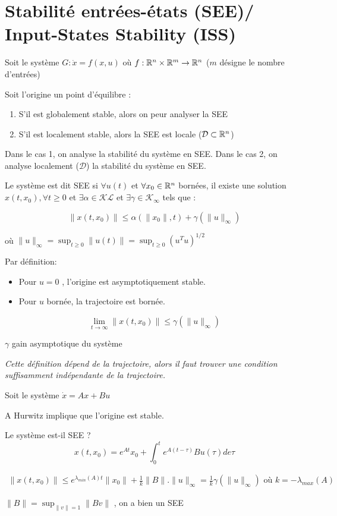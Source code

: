 \documentclass[main.tex]{subfiles} \newcommand{\D}{\mathcal{D}}
\newcommand{\Kc}{\mathcal{K}} \newcommand{\Lc}{\mathcal{L}}
\begin{document}
\section{Stabilité entrées-états (SEE)/ Input-States Stability (ISS)}

Soit le système $ G: \dot{x}=f(x,u)$ où $f:\mathbb{R}^n \times \mathbb{R}^m \rightarrow \mathbb{R}^n$
($m$ désigne le nombre d'entrées)

Soit l'origine un point d'équilibre :

\begin{enumerate} \item S'il est globalement stable, alors on peur analyser la
SEE \item S'il est localement stable, alors la SEE est locale ($\D \subset
\R^n$) \end{enumerate}

Dans le cas 1, on analyse la stabilité du système en SEE. Dans le cas 2, on
analyse localement ($\D$) la stabilité du système en SEE.

\begin{defin} Le système est dit SEE si $\forall u(t)$ et $\forall x_0 \in
	\mathbb{R}^n$ bornées, il existe une solution $x(t,x_0), \forall t \geq 0$ et
	$\exists \alpha \in \Kc\Lc$ et $\exists\gamma \in \Kc_{\infty}$ tels que :

  \[ \|x(t,x_0)\| \leq \alpha(\|x_0\|,t) + \gamma(\|u\|_{\infty})\]

  où $\|u\|_{\infty} = \sup_{t\geq0}\|u(t)\| = \sup_{t\geq0} (u^Tu)^{1/2}$

\end{defin} \begin{prop} Par définition: \begin{itemize} \item Pour $u=0$ ,
l'origine est asymptotiquement stable.  \item Pour $u$ bornée, la trajectoire
est bornée.  \end{itemize} \end{prop} \begin{rem} \[ \lim_{t \to \infty}
		\|x(t,x_0)\| \leq \gamma (\|u\|_{\infty}) \]

  $\gamma$ gain asymptotique du système \end{rem}


\emph{Cette définition dépend de la trajectoire, alors il faut trouver une
condition suffisamment indépendante de la trajectoire.}


\begin{exemple} Soit le système $\dot{x}= Ax + Bu$

  A Hurwitz implique que l'origine est stable.

  Le système est-il SEE ?  \[ x(t,x_0) = e^{At}x_0 + \int_0^t e^{A(t-\tau)}
	Bu(\tau) de \tau \]

  \begin{align*} \|x(t,x_0)\| \leq e^{\lambda_{min}(A)t}\|x_0\| + \frac{1}{k}
  \|B\|.\|u\|_{\infty} = \frac{1}{k} \gamma(\|u\|_{\infty}) \text{ où } k =
  -\lambda_{max}(A) \end{align*}

  $\|B\| = \sup_{\|v\|=1} \|Bv\|$ , on a bien un SEE \end{exemple}
\end{document}
